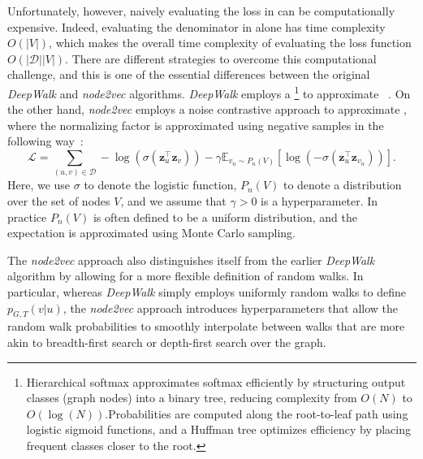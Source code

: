 Unfortunately, however, naively evaluating the loss in  can be computationally expensive. Indeed, evaluating the denominator in  alone has time complexity $O(|V|)$, which makes the overall time complexity of evaluating the loss function $O(|\mathcal{D}||V|)$. There are different strategies to overcome this computational challenge, and this is one of the essential differences between the original \textit{DeepWalk} and \textit{node2vec} algorithms. \textit{DeepWalk} employs a \footnote{Hierarchical softmax approximates softmax efficiently by structuring output classes (graph nodes) into a binary tree, reducing complexity from $O(N)$ to $O(\log(N))$.Probabilities are computed along the root-to-leaf path using logistic sigmoid functions, and a Huffman tree optimizes efficiency by placing frequent classes closer to the root.} to approximate ~\cite{Perozzi2014DeepWalk}. On the other hand, \textit{node2vec} employs a noise contrastive approach to approximate , where the normalizing factor is approximated using negative samples in the following way~\cite{Grover2016node2vec}:
\begin{equation}\label{eq:node2vecLoss}
    \mathcal{L} = \sum_{(u,v)\in\mathcal{D}} -\log(\sigma(\mathbf{z}_u^\top\mathbf{z}_v)) - \gamma\mathbb{E}_{v_n\sim P_n(V)}[\log(-\sigma(\mathbf{z}_u^\top\mathbf{z}_{v_n}))].
\end{equation}
Here, we use $\sigma$ to denote the logistic function, $P_n(V)$ to denote a distribution over the set of nodes $V$, and we assume that $\gamma > 0$ is a hyperparameter. In practice $P_n(V)$ is often defined to be a uniform distribution, and the expectation is approximated using Monte Carlo sampling.

The \textit{node2vec} approach also distinguishes itself from the earlier \textit{DeepWalk} algorithm by allowing for a more flexible definition of random walks. In particular, whereas \textit{DeepWalk} simply employs uniformly random walks to define $p_{G,T}(v|u)$, the \textit{node2vec} approach introduces hyperparameters that allow the random walk probabilities to smoothly interpolate between walks that are more akin to breadth-first search or depth-first search over the graph.

